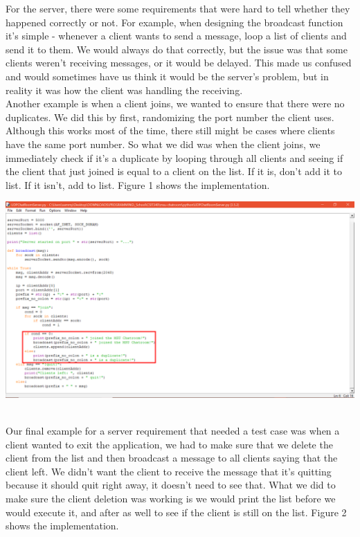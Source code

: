 \documentclass[12pt]{report}
\begin{document}
\noindent
For the server, there were some requirements that were hard to tell whether they happened correctly or not. For example, when designing the broadcast function it's simple - whenever a client wants to send a message, loop a list of clients and send it to them. We would always do that correctly, but the issue was that some clients weren't receiving messages, or it would be delayed. This made us confused and would sometimes have us think it would be the server's problem, but in reality it was how the client was handling the receiving. \\

\noindent
Another example is when a client joins, we wanted to ensure that there were no duplicates. We did this by first, randomizing the port number the client uses. Although this works most of the time, there still might be cases where clients have the same port number. So what we did was when the client joins, we immediately check if it's a duplicate by looping through all clients and seeing if the client that just joined is equal to a client on the list. If it is, don't add it to list. If it isn't, add to list. Figure 1 shows the implementation. \\

\begin{center}
\includegraphics[scale=.25]{test-case-duplicates.png}\\
\end{center} \\

\noindent
Our final example for a server requirement that needed a test case was when a client wanted to exit the application, we had to make sure that we delete the client from the list and then broadcast a message to all clients saying that the client left. We didn't want the client to receive the message that it's quitting because it should quit right away, it doesn't need to see that. What we did to make sure the client deletion was working is we would print the list before we would execute it, and after as well to see if the client is still on the list. Figure 2 shows the implementation. \\
\end{document}
